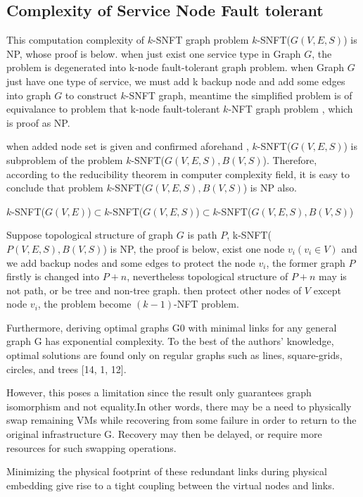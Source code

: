 \subsection{Complexity of Service Node Fault tolerant}
\label{sec:Complexity}
This computation complexity of $k$-SNFT graph problem $k$-SNFT($G(V,E,S)$) is NP, whose proof is below. when just exist one service type in Graph $G$, the problem is degenerated into k-node fault-tolerant graph problem. when Graph $G$ just have one type of service, we must add k backup node and add some edges into graph $G$ to construct $k$-SNFT graph, meantime the simplified problem is of equivalance to problem that k-node fault-tolerant $k$-NFT graph problem , which is proof as NP\cite{harary1996node}.

when added node set is given and confirmed aforehand , $k$-SNFT($G(V,E,S)$) is subproblem of the problem $k$-SNFT($G(V,E,S),B(V,S)$). Therefore, according to  the  reducibility theorem\cite{cormen2009introduction} in computer complexity field, it is easy to conclude that problem $k$-SNFT($G(V,E,S),B(V,S)$) is NP also.

$k$-SNFT($G(V,E)$)$\subset$$k$-SNFT($G(V,E,S)$)$\subset$$k$-SNFT($G(V,E,S),B(V,S)$)

Suppose topological structure of graph $G$ is path $P$, k-SNFT($P(V,E,S),B(V,S)$) is NP, the proof is below, exist one node $v_i(v_i\in V)$ and we add backup nodes and some edges to protect the node $v_i$, the former graph $P$ firstly is changed into $P+n$, nevertheless topological structure of $P+n$ may is not path, or be tree and non-tree graph. then protect other nodes of $V$ except node $v_i$, the problem become $(k-1)$-NFT problem.

Furthermore, deriving optimal graphs G0 with minimal links for any general graph G has exponential complexity. To the best of the authors’ knowledge, optimal solutions are found only on regular graphs such as lines, square-grids, circles, and trees [14, 1, 12].

However, this poses a limitation since the result only guarantees graph isomorphism and not equality.In other words, there may be a need to physically swap remaining VMs while recovering from some failure in order to return to the original infrastructure G. Recovery may then be delayed, or require more resources for such swapping operations.

Minimizing the physical footprint of these redundant links during physical embedding give rise to a tight coupling between the virtual nodes and links.

